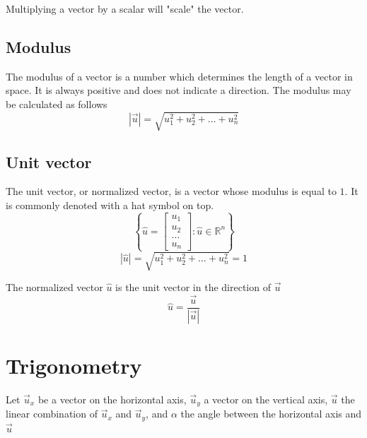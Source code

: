 \documentclass{article}
\begin{document}
Multiplying a vector by a scalar will "scale" the vector.
\begin{center}
\end{center}


\newpage
\subsection{Modulus}
The modulus of a vector is a number which determines the length of a vector in space. It is always
positive and does not indicate a direction. The modulus may be calculated as follows
\[
	|\vec{u}| = \sqrt{u_1^2 + u_2^2 + \dots + u_n^2}
\]

\subsection{Unit vector}
The unit vector, or normalized vector, is a vector whose modulus is equal to $1$. It is commonly denoted with a hat symbol on
top.
\[
	\left\lbrace \hat{u} =
		\begin{bmatrix}
			u_1 \\
			u_2 \\
			\dots \\
			u_n
		\end{bmatrix} \colon \hat{u} \in \mathbb{R}^n
	\right\rbrace
\]
\[
	|\hat{u}| = \sqrt{u_1^2 + u_2^2 + \dots + u_n^2} = 1
\]

The normalized vector $\hat{u}$ is the unit vector in the direction of $\vec{u}$
\[
	\hat{u} = \frac{\vec{u}}{|\vec{u}|}
\]

\newpage

\section{Trigonometry}
Let $\vec{u}_x$ be a vector on the horizontal axis, $\vec{u}_y$ a vector on the vertical axis,
$\vec{u}$ the linear combination of $\vec{u}_x$ and $\vec{u}_y$, and $\alpha$ the angle between the
horizontal axis and $\vec{u}$

\begin{center}
\end{center}
\end{document}
